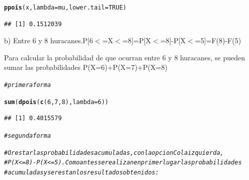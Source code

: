 \documentclass[12pt,letterpaper]{article}\usepackage[]{graphicx}\usepackage[]{color}
\makeatletter
\newcommand{\hlnum}[1]{\textcolor[rgb]{0.686,0.059,0.569}{#1}}%
\newcommand{\hlcom}[1]{\textcolor[rgb]{0.678,0.584,0.686}{\textit{#1}}}%
\newcommand{\hlstd}[1]{\textcolor[rgb]{0.345,0.345,0.345}{#1}}%
\newcommand{\hlkwc}[1]{\textcolor[rgb]{0.333,0.667,0.333}{#1}}%
\newcommand{\hlkwd}[1]{\textcolor[rgb]{0.737,0.353,0.396}{\textbf{#1}}}%
\newenvironment{kframe}{%
 \def\at@end@of@kframe{}%
 \ifinner\ifhmode%
  \def\at@end@of@kframe{\end{minipage}}%
  \begin{minipage}{\columnwidth}%
 \fi\fi%
 \def\FrameCommand##1{\hskip\@totalleftmargin \hskip-\fboxsep
 \colorbox{shadecolor}{##1}\hskip-\fboxsep
     \hskip-\linewidth \hskip-\@totalleftmargin \hskip\columnwidth}%
 \MakeFramed {\advance\hsize-\width
   \@totalleftmargin\z@ \linewidth\hsize
   \@setminipage}}%
 {\par\unskip\endMakeFramed%
 \at@end@of@kframe}
\newenvironment{knitrout}{}{} %
\makeatother
\begin{document}
\begin{itemize}
\begin{knitrout}
\begin{kframe}
\begin{alltt}
\hlkwd{ppois}\hlstd{(x,} \hlkwc{lambda} \hlstd{= mu,} \hlkwc{lower.tail}\hlstd{=}\hlnum{TRUE}\hlstd{)}
\end{alltt}
\begin{verbatim}
## [1] 0.1512039
\end{verbatim}
\end{kframe}
\end{knitrout}
\begin{description}
\item b) Entre 6 y 8 huracanes.P[6$<$=X$<$=8]=P[X$<$=8]-P[X$<$=5]=F(8)-F(5)
\end{description}
Para calcular la probabilidad de que ocurran entre 6 y 8 huracanes, se pueden sumar las probabilidades P(X=6)+P(X=7)+P(X=8)
\begin{knitrout}
\color{fgcolor}\begin{kframe}
\begin{alltt}
\hlcom{# primera forma }

\hlkwd{sum}\hlstd{(}\hlkwd{dpois}\hlstd{(}\hlkwd{c}\hlstd{(}\hlnum{6}\hlstd{,}\hlnum{7}\hlstd{,}\hlnum{8}\hlstd{),}\hlkwc{lambda} \hlstd{=} \hlnum{6}\hlstd{))}
\end{alltt}
\begin{verbatim}
## [1] 0.4015579
\end{verbatim}
\end{kframe}
\end{knitrout}

\begin{knitrout}
\color{fgcolor}\begin{kframe}
\begin{alltt}
\hlcom{# segunda forma}

\hlcom{# O restar las probabilidades acumuladas, con la opcion Cola izquierda, }
\hlcom{# P(X<=8)-P(X<=5).Como antes se realizan en primer lugar las probabilidades }
\hlcom{# acumuladas y se restan los resultados obtenidos:}


\end{alltt}
\end{kframe}
\end{knitrout}
\end{itemize}
\end{document}
